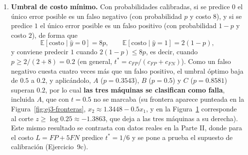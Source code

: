 \begin{enumerate}
\begin{figure}[H]
\centering
{}
\caption{Sigmoide $p=\sigma(z)$ con los umbrales $t=0.2$, $0.5$ y $0.8$:
cada línea horizontal $p=t$ corta la curva en $z=\log\frac{t}{1-t}$
($-1.3863$, $0$ y $1.3863$), y se predice falla a la derecha de ese
corte. Las máquinas $A$, $B$ y $C$ ocupan el mismo punto de la curva
para cualquier umbral, de modo que $t$ solo cambia el corte en $z$ y no
las probabilidades.}
\label{fig:ej3-sigmoide}
\end{figure}

\item \textbf{Umbral de costo mínimo.}
Con probabilidades calibradas, si se predice $0$ el único error posible
es un falso negativo (con probabilidad $p$ y costo $8$), y si se predice
$1$ el único error posible es un falso positivo (con probabilidad $1-p$
y costo $2$), de forma que
\[
    \mathbb{E}[\text{costo}\mid\hat y=0] = 8p,
    \qquad
    \mathbb{E}[\text{costo}\mid\hat y=1] = 2(1-p),
\]
y conviene predecir $1$ cuando $2(1-p)\le8p$, es decir, cuando
$p\ge 2/(2+8)=\mathbf{0.2}$ (en general,
$t^*=c_{FP}/(c_{FP}+c_{FN})$). Como un falso negativo cuesta
cuatro veces más que un falso positivo, el umbral óptimo baja de $0.5$
a $0.2$, y aplicándolo, $A$ ($p=0.3543$), $B$ ($p=0.5$) y $C$
($p=0.8581$) superan $0.2$, por lo cual \textbf{las tres máquinas se
clasifican como falla}, incluida $A$, que con $t=0.5$ no se marcaba
(su frontera aparece punteada en la Figura~\ref{fig:ej3-fronteras},
$x_2\approx1.3448-0.5x_1$, y en la Figura~\ref{fig:ej3-sigmoide}
corresponde al corte $z\ge\log 0.25\approx-1.3863$, que deja a las tres
máquinas a su derecha). Este mismo resultado se contrasta con datos reales
en la Parte II, donde para el costo $L=FP+5FN$ predice $t^*=1/6$ y se pone
a prueba el supuesto de calibración (Ejercicio~9c).


\end{enumerate}
